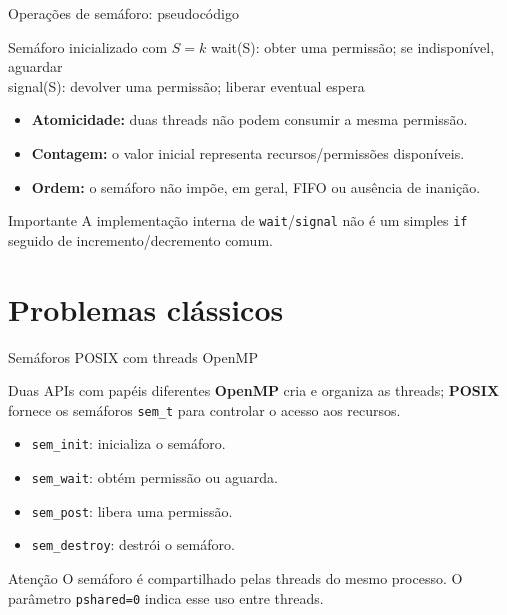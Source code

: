 \documentclass[aspectratio=169,11pt]{beamer}
\begin{document}
\begin{frame}{Operações de semáforo: pseudocódigo}
\begin{block}{Semáforo inicializado com $S = k$}
\ttfamily\small
wait(S): obter uma permissão; se indisponível, aguardar\\[0.18cm]
signal(S): devolver uma permissão; liberar eventual espera
\end{block}
\vspace{0.25cm}
\begin{itemize}
\item \textbf{Atomicidade:} duas threads não podem consumir a mesma permissão.
\item \textbf{Contagem:} o valor inicial representa recursos/permissões disponíveis.
\item \textbf{Ordem:} o semáforo não impõe, em geral, FIFO ou ausência de inanição.
\end{itemize}
\begin{alertblock}{Importante}
A implementação interna de \texttt{wait}/\texttt{signal} não é um simples \texttt{if} seguido de incremento/decremento comum.
\end{alertblock}
\end{frame}



\section{Problemas clássicos}

\begin{frame}{Semáforos POSIX com threads OpenMP}
\begin{block}{Duas APIs com papéis diferentes}
\textbf{OpenMP} cria e organiza as threads; \textbf{POSIX} fornece os semáforos \texttt{sem\_t} para controlar o acesso aos recursos.
\end{block}
\begin{itemize}
\item \texttt{sem\_init}: inicializa o semáforo.
\item \texttt{sem\_wait}: obtém permissão ou aguarda.
\item \texttt{sem\_post}: libera uma permissão.
\item \texttt{sem\_destroy}: destrói o semáforo.
\end{itemize}
\begin{alertblock}{Atenção}
O semáforo é compartilhado pelas threads do mesmo processo. O parâmetro \texttt{pshared=0} indica esse uso entre threads.
\end{alertblock}
\end{frame}
\end{document}
